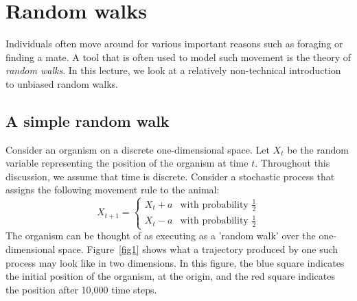 \chapter{Random walks}

Individuals often move around for various important reasons such as foraging or finding a mate. A tool that is often used to model such movement is the theory of \textit{random walks}. In this lecture, we look at a relatively non-technical introduction to unbiased random walks.

\section{A simple random walk}

Consider an organism on a discrete one-dimensional space. Let $X_t$ be the random variable representing the position of the organism at time $t$. Throughout this discussion, we assume that time is discrete. Consider a stochastic process that assigns the following movement rule to the animal:
\begin{equation}
	\label{bernoulli}
	X_{t+1} = 
	\begin{cases}
		X_t + a & \textrm{with probability } \frac{1}{2}\\
		X_t - a & \textrm{with probability } \frac{1}{2}
	\end{cases}
\end{equation}
The organism can be thought of as executing as a 'random walk' over the one-dimensional space. Figure~\ref{fig1} shows what a trajectory produced by one such process may look like in two dimensions. In this figure, the blue square indicates the initial position of the organism, at the origin, and the red square indicates the position after 10,000 time steps. 
{}

